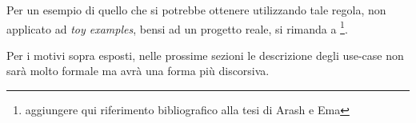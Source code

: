 Per un esempio di quello che si potrebbe ottenere utilizzando tale
regola, non applicato ad \emph{toy examples}, bensi ad un progetto
reale, si rimanda a \footnote{aggiungere qui riferimento bibliografico
  alla tesi di Arash e Ema}.

Per i motivi sopra esposti, nelle prossime sezioni le descrizione
degli use-case non sar\`a molto formale ma avr\`a una forma pi\`u
discorsiva.